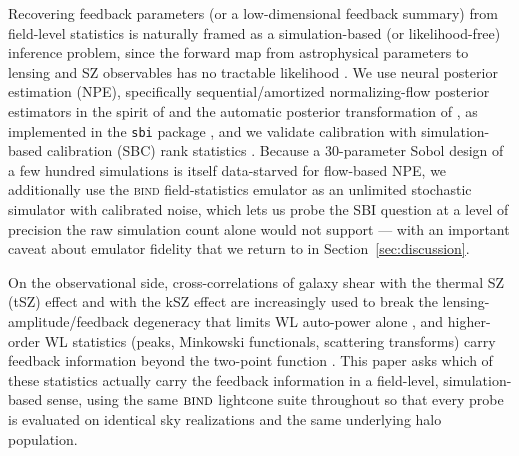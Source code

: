 \documentclass[11pt]{article}
\newcommand{\bind}{\textsc{bind}}
\begin{document}
Recovering feedback parameters (or a low-dimensional feedback summary)
from field-level statistics is naturally framed as a simulation-based (or
likelihood-free) inference problem, since the forward map from
astrophysical parameters to lensing and SZ observables has no tractable
likelihood \citep{Cranmer2020SBI}. We use neural posterior estimation
(NPE), specifically sequential/amortized normalizing-flow posterior
estimators in the spirit of \citet{PapamakariosMurray2016} and the
automatic posterior transformation of \citet{Greenberg2019APT}, as
implemented in the \texttt{sbi} package \citep{TejeroCantero2020sbi}, and
we validate calibration with simulation-based calibration (SBC) rank
statistics \citep{Talts2018SBC}. Because a 30-parameter Sobol design of a
few hundred simulations is itself data-starved for flow-based NPE, we
additionally use the \bind{} field-statistics emulator
\citep[Paper~I, in prep]{bindI} as an unlimited stochastic simulator with
calibrated noise, which lets us
probe the SBI question at a level of precision the raw simulation count
alone would not support — with an important caveat about emulator
fidelity that we return to in Section~\ref{sec:discussion}.

On the observational side, cross-correlations of galaxy shear with the
thermal SZ (tSZ) effect and with the kSZ effect are increasingly used to
break the lensing-amplitude/feedback degeneracy that limits WL auto-power
alone
\citep{HillSpergel2014,Battaglia2012pressure,Amodeo2021kSZ,Troster2021KiDSPlanck,
Gatti2021DESACT,Pandey2022DESACT,DESACTTSZWL2025,BigwoodAmon2024}, and
higher-order WL statistics (peaks, Minkowski functionals, scattering
transforms) carry feedback information beyond the two-point function
\citep{Martinet2021peaks,Zurcher2022MFs,Cheng2020WST,Gatti2022HOScos,Gatti2023maplevel}.
This paper asks which of these statistics actually carry the feedback
information in a field-level, simulation-based sense, using the same
$\bind$ lightcone suite throughout so that every probe is evaluated on
identical sky realizations and the same underlying halo population.
\end{document}
